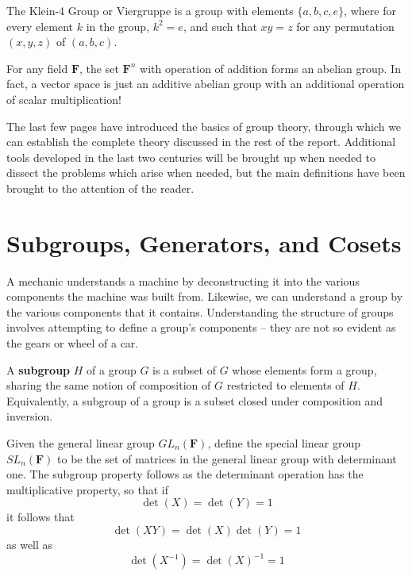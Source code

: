 \begin{example}
    The Klein-4 Group  or Viergruppe  is a group with elements $\{ a,b,c,e \}$, where for every element $k$ in the group, $k^2 = e$, and such that $xy = z$ for any permutation $(x,y,z)$ of $(a,b,c)$.
\end{example}

\begin{example}
    For any field $\mathbf{F}$, the set $\mathbf{F}^n$ with operation of addition forms an abelian group. In fact, a vector space is just an additive abelian group with an additional operation of scalar multiplication!
\end{example}

The last few pages have introduced the basics of group theory, through which we can establish the complete theory discussed in the rest of the report. Additional tools developed in the last two centuries will be brought up when needed to dissect the problems which arise when needed, but the main definitions have been brought to the attention of the reader.





\chapter{Subgroups, Generators, and Cosets}

A mechanic understands a machine by deconstructing it into the various components the machine was built from. Likewise, we can understand a group by the various components that it contains. Understanding the structure of groups involves attempting to define a group's components -- they are not so evident as the gears or wheel of a car.

\begin{definition}
    A {\bf subgroup} $H$ of a group $G$ is a subset of $G$ whose elements form a group, sharing the same notion of composition of $G$ restricted to elements of $H$. Equivalently, a subgroup of a group is a subset closed under composition and inversion.
\end{definition}

\begin{example}
    Given the general linear group $GL_n(\mathbf{F})$, define the special linear group $SL_n(\mathbf{F})$  to be the set of matrices in the general linear group with determinant one. The subgroup property follows as the determinant operation has the multiplicative property, so that if
    \[ \det(X) = \det(Y) = 1 \]
    it follows that
    \[ \det(XY) = \det(X)\det(Y) = 1 \]
    as well as
    \[ \det(X^{-1}) = \det(X)^{-1} = 1 \]
\end{example}


